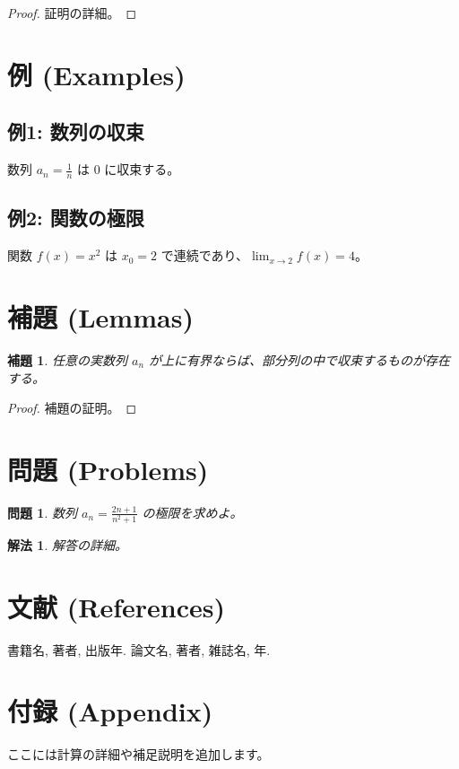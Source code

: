 \documentclass[a4paper, 12pt]{article}
\newtheorem{lemma}{補題}[section]       %
\newtheorem{problem}{問題}[section]
\newtheorem{solution}{解法}[section]
\begin{document}
\begin{proof}
    証明の詳細。
\end{proof}

\section{例 (Examples)}
\subsection{例1: 数列の収束}
数列 $a_n = \frac{1}{n}$ は $0$ に収束する。

\subsection{例2: 関数の極限}
関数 $f(x) = x^2$ は $x_0 = 2$ で連続であり、$\lim_{x \to 2} f(x) = 4$。

\section{補題 (Lemmas)}
\begin{lemma}
    任意の実数列 $a_n$ が上に有界ならば、部分列の中で収束するものが存在する。
\end{lemma}

\begin{proof}
    補題の証明。
\end{proof}

\section{問題 (Problems)}
\begin{problem}
    数列 $a_n = \frac{2n+1}{n^2 + 1}$ の極限を求めよ。
\end{problem}

\begin{solution}
    解答の詳細。
\end{solution}

\section{文献 (References)}
\begin{thebibliography}{99}
     書籍名, 著者, 出版年.
     論文名, 著者, 雑誌名, 年.
\end{thebibliography}

\appendix
\section{付録 (Appendix)}
ここには計算の詳細や補足説明を追加します。
\end{document}
